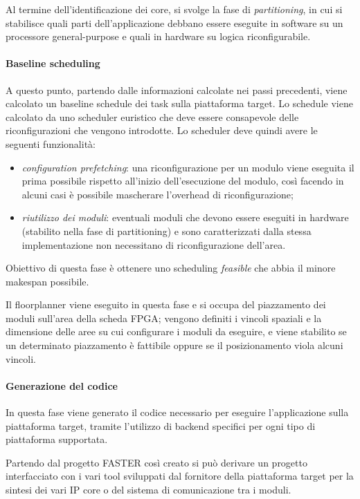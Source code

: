 Al termine dell'identificazione dei core, si svolge la fase di 
\emph{partitioning}, in cui si stabilisce quali parti dell'applicazione debbano 
essere eseguite in software su un processore general-purpose e quali in 
hardware su logica riconfigurabile.

\paragraph{Baseline scheduling}
A questo punto, partendo dalle informazioni calcolate nei passi precedenti, 
viene calcolato un baseline schedule dei task sulla piattaforma target. Lo 
schedule viene calcolato da uno scheduler euristico che deve essere consapevole
delle riconfigurazioni che vengono introdotte. Lo scheduler deve quindi 
avere le seguenti funzionalità:
\begin{itemize}
 \item \emph{configuration prefetching}: una riconfigurazione per un 
modulo viene eseguita il prima possibile rispetto all'inizio dell'esecuzione 
del modulo, così facendo in alcuni casi è possibile mascherare l'overhead di 
riconfigurazione;
 \item \emph{riutilizzo dei moduli}: eventuali moduli che devono 
essere eseguiti in hardware (stabilito nella fase di partitioning) e sono 
caratterizzati dalla stessa implementazione non necessitano di riconfigurazione 
dell'area.
\end{itemize}
Obiettivo di questa fase è ottenere uno scheduling \emph{feasible} che abbia il 
minore makespan possibile.

Il floorplanner viene eseguito in questa fase e si occupa del piazzamento dei 
moduli sull'area della scheda \ac{FPGA}; vengono definiti i vincoli spaziali e 
la dimensione delle aree su cui configurare i moduli da eseguire, e viene 
stabilito se un determinato piazzamento è fattibile oppure se il posizionamento
viola alcuni vincoli.

\paragraph{Generazione del codice} %
In questa fase viene generato il codice necessario per eseguire l'applicazione 
sulla piattaforma target, tramite l'utilizzo di backend specifici per ogni tipo 
di piattaforma supportata.

Partendo dal progetto \ac{FASTER} così creato si può derivare un progetto 
interfacciato con i vari tool sviluppati dal fornitore della piattaforma target 
per la sintesi dei vari IP core o del sistema di comunicazione tra i moduli.


